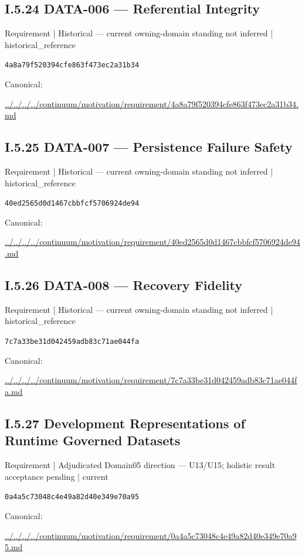 \documentclass[10pt,a4paper]{article}
\begin{document}
\subsection*{I.5.24 DATA-006 — Referential Integrity}
\label{element-4a8a79f520394cfe863f473ec2a31b34}
{\small Requirement | Historical — current owning-domain standing not inferred | historical\_reference}\par
\texttt{4a8a79f520394cfe863f473ec2a31b34}\par
Canonical: \par
{\footnotesize\url{../../../../continuum/motivation/requirement/4a8a79f520394cfe863f473ec2a31b34.md}}\par
\subsection*{I.5.25 DATA-007 — Persistence Failure Safety}
\label{element-40ed2565d0d1467cbbfcf5706924de94}
{\small Requirement | Historical — current owning-domain standing not inferred | historical\_reference}\par
\texttt{40ed2565d0d1467cbbfcf5706924de94}\par
Canonical: \par
{\footnotesize\url{../../../../continuum/motivation/requirement/40ed2565d0d1467cbbfcf5706924de94.md}}\par
\subsection*{I.5.26 DATA-008 — Recovery Fidelity}
\label{element-7c7a33be31d042459adb83c71ae044fa}
{\small Requirement | Historical — current owning-domain standing not inferred | historical\_reference}\par
\texttt{7c7a33be31d042459adb83c71ae044fa}\par
Canonical: \par
{\footnotesize\url{../../../../continuum/motivation/requirement/7c7a33be31d042459adb83c71ae044fa.md}}\par
\subsection*{I.5.27 Development Representations of Runtime Governed Datasets}
\label{element-0a4a5c73048c4e49a82d40e349e70a95}
{\small Requirement | Adjudicated Domain05 direction — U13/U15; holistic result acceptance pending | current}\par
\texttt{0a4a5c73048c4e49a82d40e349e70a95}\par
Canonical: \par
{\footnotesize\url{../../../../continuum/motivation/requirement/0a4a5c73048c4e49a82d40e349e70a95.md}}\par
\end{document}
